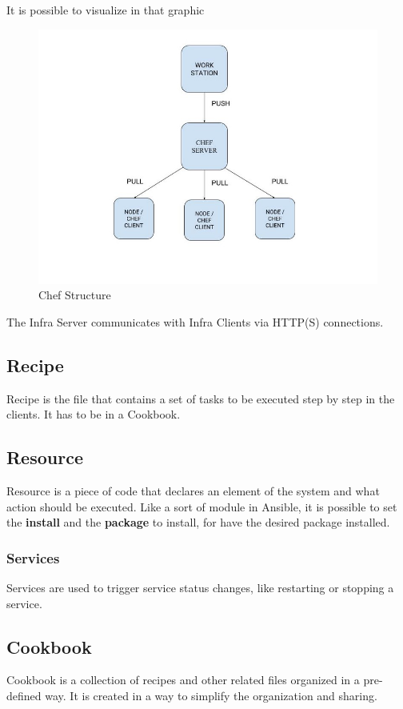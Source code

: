 \documentclass[12pt,a4paper,openright,twoside]{book}
\begin{document}
It is possible to visualize in that graphic \cite{chefFreeCodeCamp}
\newline

\begin{figure}[H]
    \centering
    \includegraphics[width=.8\linewidth]{figures/img_Chef_structure.jpeg}
    \caption{Chef Structure}
    \label{fig:chef-structure-image}
\end{figure}

The Infra Server communicates with Infra Clients via HTTP(S) connections.

\subsection{Recipe}
Recipe is the file that contains a set of tasks to be executed step by step in the clients. It has to be in a Cookbook.

\subsection{Resource}
Resource is a piece of code that declares an element of the system and what action should be executed.
Like a sort of module in Ansible, it is possible to set the \textbf{install} and the \textbf{package} to install, for have the desired package installed.

\subsubsection{Services}
Services are used to trigger service status changes, like restarting or stopping a service.

\subsection{Cookbook}
Cookbook is a collection of recipes and other related files organized in a pre-defined way. It is created in a way to simplify the organization and sharing.
\end{document}
